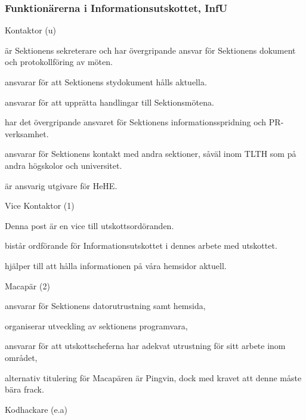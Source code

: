 \documentclass[10pt]{article}
\begin{document}
\subsubsection{Funktionärerna i Informationsutskottet, InfU}
\begin{emptylist}
    \item Kontaktor (u)
        \begin{dashlist}
            \item är Sektionens sekreterare och har övergripande ansvar för Sektionens dokument och protokollföring av möten.
            \item ansvarar för att Sektionens stydokument hålls aktuella.
            \item ansvarar för att upprätta handlingar till Sektionsmötena.
            \item har det övergripande ansvaret för Sektionens informationsspridning och PR-verksamhet.
            \item ansvarar för Sektionens kontakt med andra sektioner, såväl inom TLTH som på andra högskolor och universitet.
            \item är ansvarig utgivare för HeHE.
        \end{dashlist}
    \item Vice Kontaktor (1)
        \begin{dashlist}
            \item Denna post är en vice till utskottsordöranden.
            \item bistår ordförande för Informationsutskottet i dennes arbete med utskottet.
            \item hjälper till att hålla informationen på våra hemsidor aktuell.
        \end{dashlist}
    \item Macapär (2)
        \begin{dashlist}
            \item ansvarar för Sektionens datorutrustning samt hemsida,
            \item organiserar utveckling av sektionens programvara,
            \item ansvarar för att utskottscheferna har adekvat utrustning
                för sitt arbete inom området,
            \item alternativ titulering för Macapären är Pingvin, dock
                med kravet att denne måste bära frack.
        \end{dashlist}
	\item Kodhackare (e.a)

\end{emptylist}
\end{document}
